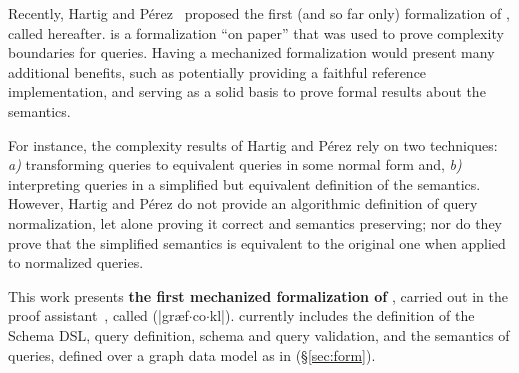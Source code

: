 Recently, Hartig and Pérez~\cite{gqlph} proposed the first (and so far only) formalization of \gql, called \HP hereafter. 
\HP is a formalization ``on paper'' that was used to prove complexity boundaries for \gql queries. Having a mechanized formalization would present many additional benefits, such as potentially providing a faithful reference implementation, and serving as a solid basis to prove formal results about the \gql semantics. 

For instance, the complexity results of Hartig and Pérez rely on two techniques: {\em a)} transforming queries to equivalent queries in some  normal form and, {\em b)} interpreting queries in a simplified but equivalent definition of the semantics. However, Hartig and Pérez do not provide an algorithmic definition of query normalization, let alone proving it correct and semantics preserving;
nor do they prove that the simplified semantics is equivalent to the original one when applied to normalized queries.



This work presents {\bf the first mechanized formalization of \gql}, carried out in the \coq proof assistant~\cite{Coq}, called \gcoql (|græf$\cdot$co$\cdot$k{\pmschwa}l|). 
\gcoql currently includes the definition of the Schema DSL, query definition, schema and query validation, and the semantics of queries, defined over a graph data model as in \HP (\S\ref{sec:form}).

